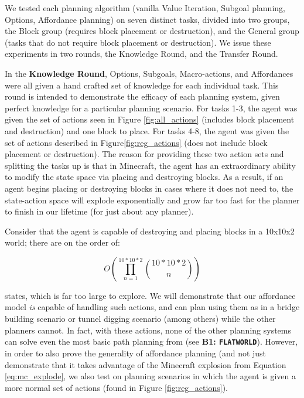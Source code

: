 \documentclass[]{article}
\begin{document}
We tested each planning algorithm (vanilla Value Iteration, Subgoal planning, Options, Affordance planning) on seven distinct tasks, divided into two groups, the Block group (requires block placement or destruction), and the General group (tasks that do not require block placement or destruction). We issue these experiments in two rounds, the Knowledge Round, and the Transfer Round.



In the {\bf Knowledge Round}, Options, Subgoals, Macro-actions, and Affordances were all given a hand crafted set of knowledge for each individual task. This round is intended to demonstrate the efficacy of each planning system, given perfect knowledge for a particular planning scenario. For tasks 1-3, the agent was given the set of actions seen in Figure \ref{fig:all_actions} (includes block placement and destruction) and one block to place. For tasks 4-8, the agent was given the set of actions described in Figure\ref{fig:reg_actions} (does not include block placement or destruction). The reason for providing these two action sets and splitting the tasks up is that in Minecraft, the agent has an extraordinary ability to modify the state space via placing and destroying blocks. As a result, if an agent begins placing or destroying blocks in cases where it does not need to, the state-action space will explode exponentially and grow far too fast for the planner to finish in our lifetime (for just about any planner). 

Consider that the agent is capable of destroying and placing blocks in a 10x10x2 world; there are on the order of:

\begin{equation}
O\left(\prod_{n=1}^{10*10*2} \binom{10*10*2}{n}\right)
\label{eq:mc_explode}
\end{equation}

states, which is far too large to explore. We will demonstrate that our affordance model {\it is} capable of handling such actions, and can plan using them as in a bridge building scenario or tunnel digging scenario (among others) while the other planners cannot. In fact, with these actions, none of the other planning systems can solve even the most basic path planning from (see {\bf B1: \texttt{FLATWORLD}}). However, in order to also prove the generality of affordance planning (and not just demonstrate that it takes advantage of the Minecraft explosion from Equation \ref{eq:mc_explode}, we also test on planning scenarios in which the agent is given a more normal set of actions (found in Figure \ref{fig:reg_actions}).
\end{document}
